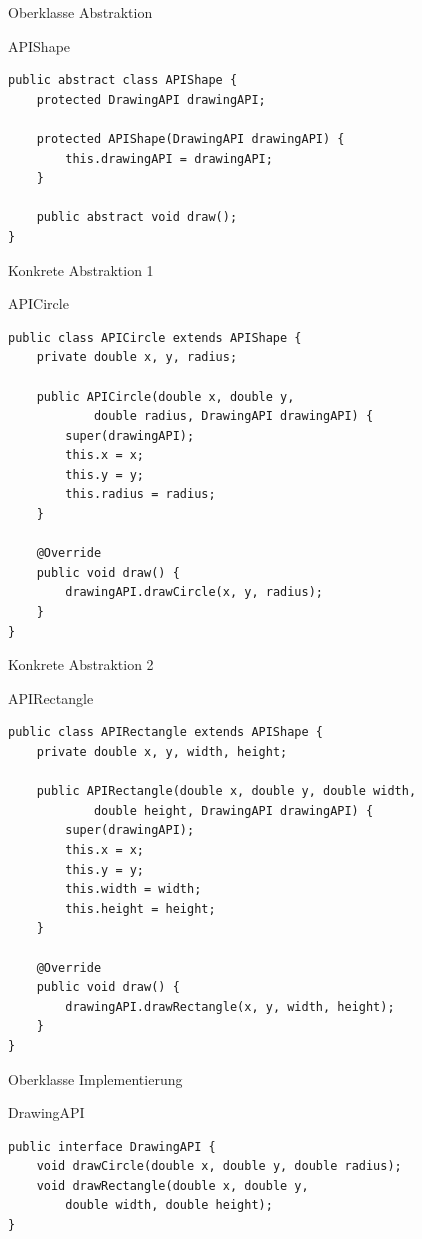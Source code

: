 \begin{frame}[fragile]{Oberklasse Abstraktion}
	\begin{exampleblock}{APIShape}
 		\begin{lstlisting}
public abstract class APIShape {
    protected DrawingAPI drawingAPI;

    protected APIShape(DrawingAPI drawingAPI) {
        this.drawingAPI = drawingAPI;
    }

    public abstract void draw();
}
 		\end{lstlisting}
 	\end{exampleblock}
\end{frame}

\begin{frame}[fragile]{Konkrete Abstraktion 1}
	\begin{exampleblock}{APICircle}
 		\begin{lstlisting}
public class APICircle extends APIShape {
    private double x, y, radius;

    public APICircle(double x, double y, 
            double radius, DrawingAPI drawingAPI) {
        super(drawingAPI);
        this.x = x;
        this.y = y;
        this.radius = radius;
    }

    @Override
    public void draw() {
        drawingAPI.drawCircle(x, y, radius);
    }
}
 		\end{lstlisting}
 	\end{exampleblock}
\end{frame}

\begin{frame}[fragile]{Konkrete Abstraktion 2}
	\begin{exampleblock}{APIRectangle}
 		\begin{lstlisting}
public class APIRectangle extends APIShape {
    private double x, y, width, height;

    public APIRectangle(double x, double y, double width,
            double height, DrawingAPI drawingAPI) {
        super(drawingAPI);
        this.x = x;
        this.y = y;
        this.width = width;
        this.height = height;
    }

    @Override
    public void draw() {
        drawingAPI.drawRectangle(x, y, width, height);
    }
}
 		\end{lstlisting}
 	\end{exampleblock}
\end{frame}

\begin{frame}[fragile]{Oberklasse Implementierung}
	\begin{exampleblock}{DrawingAPI}
 		\begin{lstlisting}
public interface DrawingAPI {
    void drawCircle(double x, double y, double radius);
    void drawRectangle(double x, double y, 
        double width, double height);
}
 		\end{lstlisting}
 	\end{exampleblock}
\end{frame}

